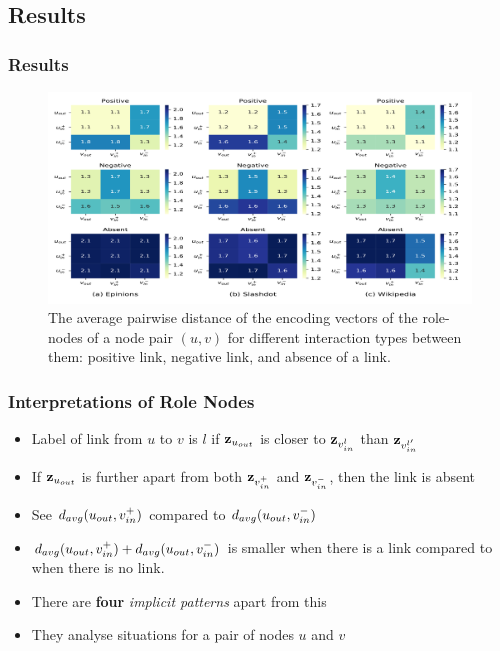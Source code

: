 \documentclass{beamer}
\begin{document}
\subsection{Results}

\begin{frame}
    \frametitle{Results}
    \label{slide:results}
    \begin{figure}[htp]
        \centering
        \includegraphics[width=\textwidth]{images/results.png}   
        \caption{The average pairwise distance of the encoding vectors of the role-nodes of a node pair $(u, v)$ for different interaction types between them: positive link, negative link, and absence of a link.}
    \end{figure}
\end{frame}

 \begin{frame}
     \frametitle{Interpretations of Role Nodes}
    \begin{itemize}
        \item Label of link from $u$ to $v$ is $l$ if $\mathbf{z}_{u_{out}}$ is closer to $\mathbf{z}_{v_{in}^{l}}$ than $\mathbf{z}_{v_{in}^{l^\prime}}$
        \item If $\mathbf{z}_{u_{out}}$ is further apart from both $\mathbf{z}_{v_{in}^{+}}$ and $\mathbf{z}_{v_{in}^{-}}$, then the link is absent
        \item See $d_{avg}(u_{out},v_{in}^{+})$ compared to $d_{avg}(u_{out},v_{in}^{-})$
        \item $d_{avg}(u_{out},v_{in}^{+})+d_{avg}(u_{out},v_{in}^{-})$ is smaller when there is a link compared to when there is no link.
        \item There are \textbf{four} \textit{implicit patterns} apart from this
        \item They analyse situations for a pair of nodes $u$ and $v$ 
    \end{itemize}
\end{frame}
\end{document}
